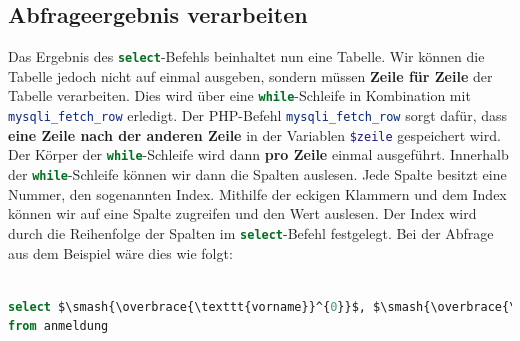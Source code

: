 \subsection{Abfrageergebnis verarbeiten}

Das Ergebnis des \lstinline[language=SQL]{select}-Befehls beinhaltet nun eine Tabelle. Wir können die Tabelle jedoch nicht auf einmal ausgeben, sondern müssen \textbf{Zeile für Zeile} der Tabelle verarbeiten. Dies wird über eine \lstinline[language=PHP]{while}-Schleife in Kombination mit \lstinline[language=PHP]{mysqli_fetch_row} erledigt. Der \ac{PHP}-Befehl \lstinline[language=PHP]{mysqli_fetch_row} sorgt dafür, dass \textbf{eine Zeile nach der anderen Zeile} in der Variablen \lstinline[language=PHP]{$zeile} gespeichert wird. Der Körper der \lstinline[language=PHP]{while}-Schleife wird dann \textbf{pro Zeile} einmal ausgeführt. Innerhalb der \lstinline[language=PHP]{while}-Schleife können wir dann die Spalten auslesen. Jede Spalte besitzt eine Nummer, den sogenannten Index. Mithilfe der eckigen Klammern und dem Index können wir auf eine Spalte zugreifen und den Wert auslesen. Der Index wird durch die Reihenfolge der Spalten im \lstinline[language=SQL]{select}-Befehl festgelegt. Bei der Abfrage aus dem Beispiel wäre dies wie folgt:

\begin{lstlisting}[language=SQL, mathescape, numbers=none]

select $\smash{\overbrace{\texttt{vorname}}^{0}}$, $\smash{\overbrace{\texttt{tour}}^{1}}$, $\smash{\overbrace{\texttt{anzahl}}^{2}}$, $\smash{\overbrace{\texttt{email}}^{3}}$, $\smash{\overbrace{\texttt{passwort}}^{4}}$ 
from anmeldung
\end{lstlisting}